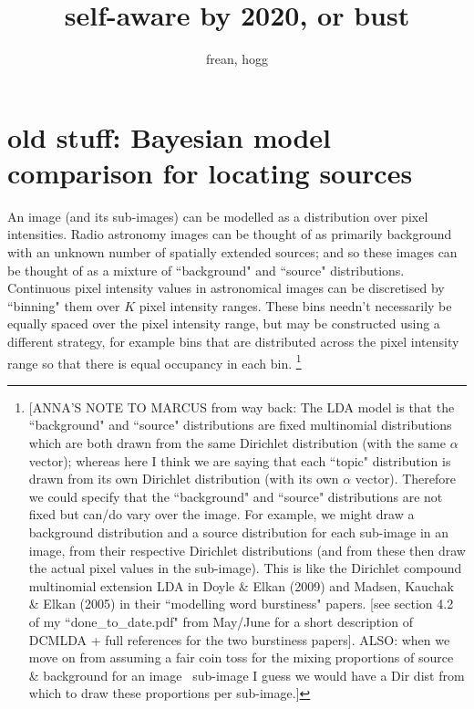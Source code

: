 \documentclass[11pt]{article}
\title{self-aware by 2020, or bust}
\author{frean, hogg}
\begin{document}
\maketitle


\section{old stuff: Bayesian model comparison for locating sources}

An image (and its sub-images) can be modelled as a distribution over
pixel intensities. Radio astronomy images can be thought of as
primarily background with an unknown number of spatially extended
sources; and so these images can be thought of as a mixture of
``background" and ``source" distributions. Continuous pixel intensity
values in astronomical images can be discretised by ``binning" them
over $K$ pixel intensity ranges. These bins needn't necessarily be
equally spaced over the pixel intensity range, but may be constructed
using a different strategy, for example bins that are distributed
across the pixel intensity range so that there is equal occupancy in
each bin.
\footnote{[ANNA'S NOTE TO MARCUS from way back: The LDA model is that
    the ``background" and ``source" distributions are fixed
    multinomial distributions which are both drawn from the same
    Dirichlet distribution (with the same $\alpha$ vector); whereas
    here I think we are saying that each ``topic" distribution is
    drawn from its own Dirichlet distribution (with its own $\alpha$
    vector). Therefore we could specify that the ``background" and
    ``source" distributions are not fixed but can/do vary over the
    image. For example, we might draw a background distribution and a
    source distribution for each sub-image in an image, from their
    respective Dirichlet distributions (and from these then draw the
    actual pixel values in the sub-image). This is like the Dirichlet
    compound multinomial extension LDA in Doyle \& Elkan (2009) and
    Madsen, Kauchak \& Elkan (2005) in their ``modelling word
    burstiness" papers. [see section 4.2 of my ``done\_to\_date.pdf"
      from May/June for a short description of DCMLDA + full
      references for the two burstiness papers]. ALSO: when we move on
    from assuming a fair coin toss for the mixing proportions of
    source \& background for an image \ sub-image I guess we would
    have a Dir dist from which to draw these proportions per
    sub-image.]}
\end{document}
